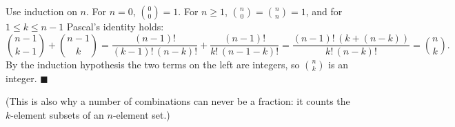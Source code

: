 Use induction on $n$. For $n=0$, $\binom00=1$. For $n\ge1$, $\binom n0=\binom nn=1$, and for $1\le k\le n-1$ Pascal's identity holds:
\[\binom{n-1}{k-1}+\binom{n-1}{k}=\dfrac{(n-1)!}{(k-1)!\,(n-k)!}+\dfrac{(n-1)!}{k!\,(n-1-k)!}=\dfrac{(n-1)!\,(k+(n-k))}{k!\,(n-k)!}=\binom nk.\]
By the induction hypothesis the two terms on the left are integers, so $\binom nk$ is an integer. $\blacksquare$

(This is also why a number of combinations can never be a fraction: it counts the $k$-element subsets of an $n$-element set.)
